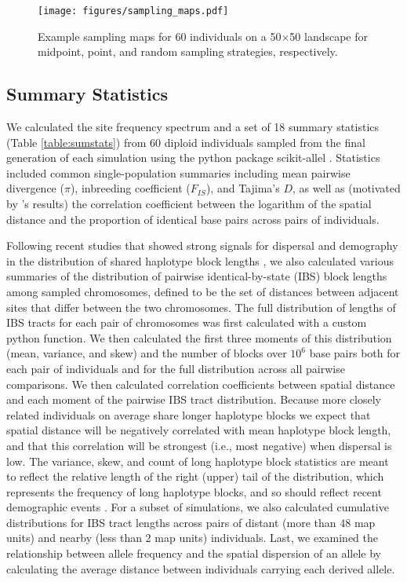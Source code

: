 \documentclass[10pt,twoside,lineno,hidelinks]{preprint}
\begin{document}
\begin{figure}[htbp]
\centering
\texttt{[image: figures/sampling\_maps.pdf]}
\caption{Example sampling maps for 60 individuals on a 50$\times$50 landscape for midpoint, point, and random sampling strategies, respectively.}
\label{fig:samplemap}
\end{figure}

\subsection{Summary Statistics}
We calculated the site frequency spectrum and a set of 18 summary statistics (Table \ref{table:sumstats}) from 60 diploid individuals sampled from the final generation of each simulation using the python package scikit-allel \citep{Miles2017}. 
Statistics included common single-population summaries including mean pairwise divergence ($\pi$), inbreeding coefficient ($F_{IS}$), and Tajima's $D$, 
as well as (motivated by \citet{Rousset1997}'s results)
the correlation coefficient between the logarithm of the spatial distance and the proportion of identical base pairs across pairs of individuals. 

Following recent studies that showed strong signals for dispersal and demography in the distribution of shared haplotype block lengths \citep[e.g.,][]{Ringbauer2017,Baharian2016}, we also calculated various summaries of the distribution of pairwise identical-by-state (IBS) block lengths among sampled chromosomes,
defined to be the set of distances between adjacent sites that differ between the two chromosomes. 
The full distribution of lengths of IBS tracts for each pair of chromosomes was first calculated with a custom python function. 
We then calculated the first three moments of this distribution (mean, variance, and skew) and the number of blocks over $10^6$ base pairs both for each pair of individuals and for the full distribution across all pairwise comparisons. 
We then calculated correlation coefficients between spatial distance and each moment of the pairwise IBS tract distribution. Because more closely related individuals on average share longer haplotype blocks we expect that spatial distance will be negatively correlated with mean haplotype block length, and that this correlation will be strongest (i.e., most negative) when dispersal is low. The variance, skew, and count of long haplotype block statistics are meant to reflect the relative length of the right (upper) tail of the distribution, which represents the frequency of long haplotype blocks, and so should reflect recent demographic events \citep{chapman2002effect}. For a subset of simulations, we also calculated cumulative distributions for IBS tract lengths across pairs of distant (more than 48 map units) and nearby (less than 2 map units) individuals. Last, we examined the relationship between allele frequency and the spatial dispersion of an allele by calculating the average distance between individuals carrying each derived allele.
\end{document}
